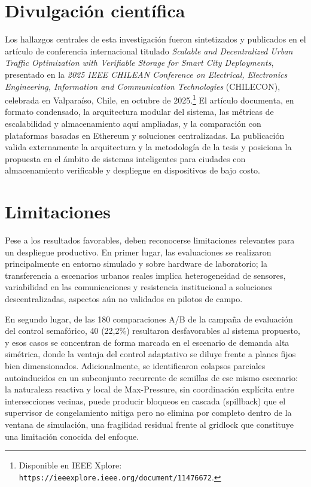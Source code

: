 \section{Divulgación científica}

Los hallazgos centrales de esta investigación fueron sintetizados y publicados en el
artículo de conferencia internacional titulado \emph{Scalable and Decentralized Urban Traffic
Optimization with Verifiable Storage for Smart City Deployments},
presentado en la \textit{2025 IEEE CHILEAN Conference on Electrical, Electronics Engineering,
Information and Communication Technologies} (CHILECON), celebrada en Valparaíso, Chile, en
octubre de 2025.\footnote{Disponible en IEEE Xplore:
\nolinkurl{https://ieeexplore.ieee.org/document/11476672}.}
El artículo documenta, en formato condensado,
la arquitectura modular del sistema, las métricas de escalabilidad y almacenamiento aquí
ampliadas, y la comparación con plataformas basadas en Ethereum y soluciones centralizadas.
La publicación valida externamente la arquitectura y la metodología de la tesis y posiciona la
propuesta en el ámbito de sistemas inteligentes para ciudades con almacenamiento verificable
y despliegue en dispositivos de bajo costo.

\section{Limitaciones}

Pese a los resultados favorables, deben reconocerse limitaciones relevantes para un
despliegue productivo. En primer lugar, las evaluaciones se realizaron principalmente en
entorno simulado y sobre hardware de laboratorio; la transferencia a escenarios urbanos reales
implica heterogeneidad de sensores, variabilidad en las comunicaciones y resistencia
institucional a soluciones descentralizadas, aspectos aún no validados en pilotos de campo.

En segundo lugar, de las 180 comparaciones A/B de la campaña de evaluación del control
semafórico, 40 (22,2\%) resultaron desfavorables al sistema propuesto, y esos casos se
concentran de forma marcada en el escenario de demanda alta simétrica, donde la ventaja
del control adaptativo se diluye frente a planes fijos bien dimensionados. Adicionalmente,
se identificaron colapsos parciales autoinducidos en un subconjunto recurrente de semillas
de ese mismo escenario: la naturaleza reactiva y local de Max-Pressure, sin coordinación
explícita entre intersecciones vecinas, puede producir bloqueos en cascada (spillback) que
el supervisor de congelamiento mitiga pero no elimina por completo dentro de la ventana de
simulación, una fragilidad residual frente al gridlock que constituye una limitación
conocida del enfoque.

